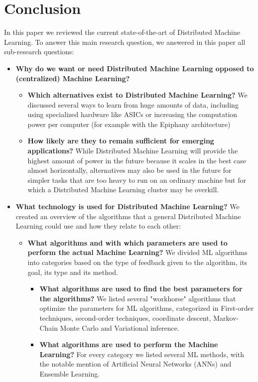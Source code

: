\section{Conclusion}
In this paper we reviewed the current state-of-the-art of Distributed Machine Learning. To answer this main research question, we answered in this paper all sub-research questions:
\begin{itemize}
	\item \textbf{Why do we want or need Distributed Machine Learning opposed to (centralized) Machine Learning?}
	\begin{itemize}
		\item \textbf{Which alternatives exist to Distributed Machine Learning?} We discussed several ways to learn from huge amounts of data, including using specialized hardware like ASICs or increasing the computation power per computer (for example with the Epiphany architecture)
		\item \textbf{How likely are they to remain sufficient for emerging applications?} While Distributed Machine Learning will provide the highest amount of power in the future because it scales in the best case almost horizontally, alternatives may also be used in the future for simpler tasks that are too heavy to run on an ordinary machine but for which a Distributed Machine Learning cluster may be overkill.
	\end{itemize}
	\item \textbf{What technology is used for Distributed Machine Learning?} We created an overview of the algorithms that a general Distributed Machine Learning could use and how they relate to each other:
	\begin{itemize}
		\item \textbf{What algorithms and with which parameters are used to perform the actual Machine Learning?} We divided ML algorithms into categories based on the type of feedback given to the algorithm, its goal, its type and its method.
		\begin{itemize}
			\item \textbf{What algorithms are used to find the best parameters for the algorithms?} We listed several "workhorse" algorithms that optimize the parameters for ML algorithms, categorized in First-order techniques, second-order techniques, coordinate descent, Markov-Chain Monte Carlo and Variational inference.
			\item \textbf{What algorithms are used to perform the Machine Learning?} For every category we listed several ML methods, with the notable mention of Artificial Neural Networks (ANNs) and Ensemble Learning.

\end{itemize}
\end{itemize}
\end{itemize}
